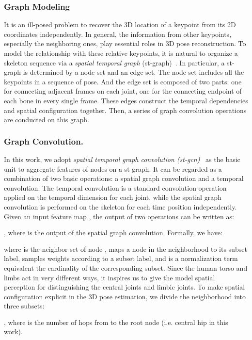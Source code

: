 \documentclass[runningheads]{llncs}
\begin{document}
\subsubsection{Graph Modeling}
It is an ill-posed problem to recover the 3D location of a keypoint from its 2D coordinates independently.
In general,
the information from other keypoints, especially
the neighboring ones,
play essential roles in 3D pose reconstruction.
To model the relationship with these relative keypoints,
it is natural to organize a skeleton sequence
via a \textit{spatial temporal graph} (st-graph)~\cite{yan2018spatial}.
In particular, a st-graph  is determined by a node set and an edge set.
The node set  includes all the keypoints in a sequence of pose.
And the edge set  is composed of two parts: one for connecting adjacent frames on each joint, one for the connecting endpoint of each bone in every single frame.
These edges construct the temporal dependencies and spatial configuration together.
Then, a series of graph convolution operations are conducted on this graph.


\subsubsection{Graph Convolution.}
In this work, we adopt \textit{spatial temporal graph convolution (st-gcn)}~\cite{yan2018spatial} as the basic unit
to aggregate features of nodes on a st-graph.
It can be regarded as a combination of two basic operations: a spatial graph convolution and a temporal convolution.
The temporal convolution  is a standard convolution operation applied on the temporal dimension for each joint,
while the spatial graph convolution  is performed on the skeleton for each time position independently.
Given an input feature map , the output of two operations can be written as:

, where  is the output of the spatial graph convolution. Formally, we have:

where  is the neighbor set of node ,
 maps a node in the neighborhood to its subset label,
 samples weights according to a subset label,
and  is a normalization term equivalent the cardinality of the corresponding subset.
Since the human torso and limbs act in very different ways,
it inspires us to give the model spatial perception for distinguishing the central joints and limbic joints.
To make spatial configuration explicit in the 3D pose estimation, we divide the neighborhood into three subsets:

, where  is the number of hops from  to the root node (i.e. central hip in this work).
\end{document}
